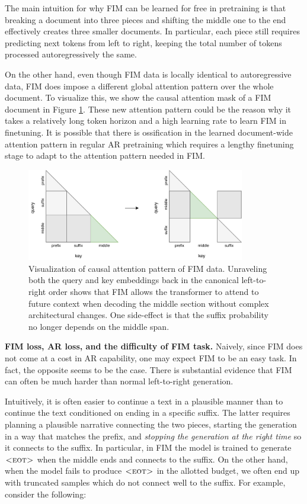 \documentclass[postscript]{article}
\begin{document}
 The main intuition for why FIM can be learned for free in pretraining is that breaking a document into three pieces and shifting the middle one to the end effectively creates three smaller documents. In particular, each piece still requires predicting next tokens from left to right, keeping the total number of tokens processed autoregressively the same.

On the other hand, even though FIM data is locally identical to autoregressive data, FIM does impose a different global attention pattern over the whole document. To visualize this, we show the causal attention mask of a FIM document in Figure \ref{fig:fim-attn}. These new attention pattern could be the reason why it takes a relatively long token horizon and a high learning rate to learn FIM in finetuning. It is possible that there is ossification \citep{hernandez2021} in the learned document-wide attention pattern in regular AR pretraining which requires a lengthy finetuning stage to adapt to the attention pattern needed in FIM.
 
 \begin{figure}[ht!]
\centering
\includegraphics[width=0.85\textwidth]{figures/attn-color.pdf}
\caption{Visualization of causal attention pattern of FIM data. Unraveling both the query and key embeddings back in the canonical left-to-right order shows that FIM allows the transformer to attend to future context when decoding the middle section without complex architectural changes. One side-effect is that the suffix probability no longer depends on the middle span.
}
\label{fig:fim-attn}
\end{figure}
 
\textbf{FIM loss, AR loss, and the difficulty of FIM task.} Naively, since FIM does not come at a cost in AR capability, one may expect FIM to be an easy task.  In fact, the opposite seems to be the case. There is substantial evidence that FIM can often be much harder than normal left-to-right generation.

Intuitively, it is often easier to continue a text in a plausible manner than to continue the text conditioned on ending in a specific suffix. The latter requires planning a plausible narrative connecting the two pieces, starting the generation in a way that matches the prefix, and \emph{stopping the generation at the right time} so it connects to the suffix. In particular, in FIM the model is trained to generate $\textsc{<eot>}$ when the middle ends and connects to the suffix. On the other hand, when the model fails to produce $\textsc{<eot>}$ in the allotted budget, we often end up with truncated samples which do not connect well to the suffix. For example, consider the following:
\end{document}
